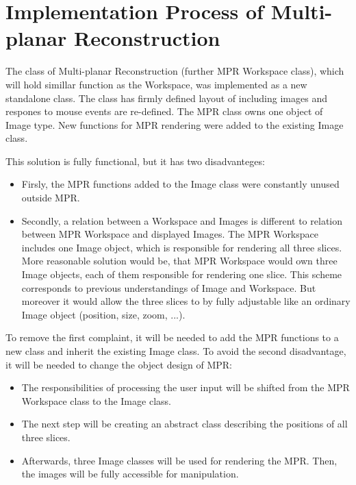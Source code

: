 \section{Implementation Process of Multi-planar Reconstruction}

The class of Multi-planar Reconstruction (further MPR Workspace class), which will hold simillar function as the Workspace, was implemented as a new standalone class. The class has firmly defined layout of including images and respones to mouse events are re-defined. The MPR class owns one object of Image type. New functions for MPR rendering were added to the existing Image class.

This solution is fully functional, but it has two disadvanteges:

\begin{itemize}
\item Firsly, the MPR functions added to the Image class were constantly unused outside MPR.
\item Secondly, a relation between a Workspace and Images is different to relation between MPR Workspace and displayed Images. The MPR Workspace includes one Image object, which is responsible for rendering all three slices. More reasonable solution would be, that MPR Workspace would own three Image objects, each of them responsible for rendering one slice. This scheme corresponds to previous understandings of Image and Workspace. But moreover it would allow the three slices to by fully adjustable like an ordinary Image object (position, size, zoom, ...). 
\end{itemize}

To remove the first complaint, it will be needed to add the MPR functions to a new class and inherit the existing Image class. To avoid the second disadvantage, it will be needed to change the object design of MPR:

\begin{itemize}
\item The responsibilities of processing the user input will be shifted from the MPR Workspace class to the Image class.
\item The next step will be creating an abstract class describing the positions of all three slices.
\item Afterwards, three Image classes will be used for rendering the MPR. Then, the images will be fully accessible for manipulation.
\end{itemize}


